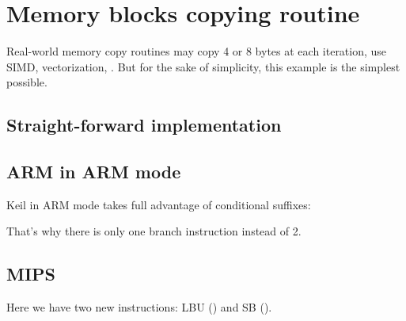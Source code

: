 ﻿\section{Memory blocks copying routine}
\label{loop_memcpy}

Real-world memory copy routines may copy 4 or 8 bytes at each iteration, use \ac{SIMD}, 
vectorization, \etc{}.
But for the sake of simplicity, this example is the simplest possible.



\subsection{Straight-forward implementation}



\ifdefined\IncludeARM





\subsection{ARM in ARM mode}

Keil in ARM mode takes full advantage of conditional suffixes:



That's why there is only one branch instruction instead of 2.

\fi

\ifdefined\IncludeMIPS
\subsection{MIPS}




Here we have two new instructions: LBU () and SB ().

